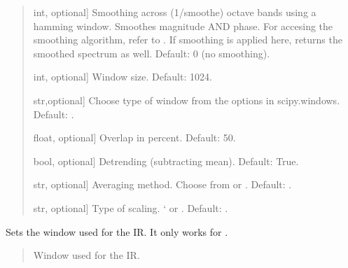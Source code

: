 \documentclass[letterpaper,10pt,english]{sphinxmanual}
\begin{document}
\begin{fulllineitems}
\begin{fulllineitems}
\begin{quote}
\begin{description}
\begin{description}
\sphinxlineitem{\sphinxstylestrong{smoothe}}{[}int, optional{]}
\sphinxAtStartPar
Smoothing across (1/smoothe) octave bands using a hamming
window. Smoothes magnitude AND phase. For accesing the smoothing
algorithm, refer to
.
If smoothing is applied here,  returns
the smoothed spectrum as well.
Default: 0 (no smoothing).

\sphinxlineitem{\sphinxstylestrong{window\_length\_samples}}{[}int, optional{]}
\sphinxAtStartPar
Window size. Default: 1024.

\sphinxlineitem{\sphinxstylestrong{window\_type}}{[}str,optional{]}
\sphinxAtStartPar
Choose type of window from the options in scipy.windows.
Default: .

\sphinxlineitem{\sphinxstylestrong{overlap\_percent}}{[}float, optional{]}
\sphinxAtStartPar
Overlap in percent. Default: 50.

\sphinxlineitem{\sphinxstylestrong{detrend}}{[}bool, optional{]}
\sphinxAtStartPar
Detrending (subtracting mean). Default: True.

\sphinxlineitem{\sphinxstylestrong{average}}{[}str, optional{]}
\sphinxAtStartPar
Averaging method. Choose from  or .
Default: .

\sphinxlineitem{\sphinxstylestrong{scaling}}{[}str, optional{]}
\sphinxAtStartPar
Type of scaling. ‘ or . Default: .

\end{description}

\end{description}\end{quote}

\end{fulllineitems}


\begin{fulllineitems}
\label{\detokenize{classes:dsptools.classes.signal_class.Signal.set_window}}
\pysigstartsignatures
{}
\pysigstopsignatures
\sphinxAtStartPar
Sets the window used for the IR. It only works for
.
\begin{quote}\begin{description}
\begin{description}
\sphinxlineitem{\sphinxstylestrong{window}}{[}\sphinxtitleref{np.ndarray}{]}
\sphinxAtStartPar
Window used for the IR.


\end{description}
\end{description}
\end{quote}
\end{fulllineitems}
\end{fulllineitems}
\end{document}
